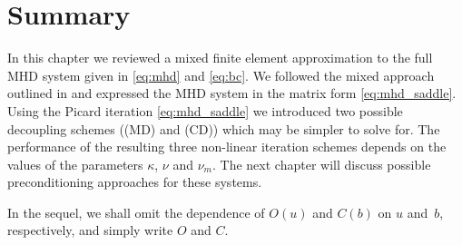 



\section{Summary}

In this chapter we reviewed a mixed finite element approximation to the full MHD system given in \eqref{eq:mhd} and \eqref{eq:bc}. We followed the mixed approach outlined in \cite{schotzau2004mixed} and expressed the MHD system in the matrix form \eqref{eq:mhd_saddle}. Using the Picard iteration  \eqref{eq:mhd_saddle} we introduced two possible decoupling schemes ((MD) and (CD)) which may be simpler to solve for. The performance of the resulting three non-linear iteration schemes depends on the values of the parameters $\kappa$, $\nu$ and $\nu_m$. The next chapter will discuss possible preconditioning approaches for these systems.

In the sequel, we shall omit the dependence of $O(u)$ and $C(b)$ on $u$ and~$b$, respectively, and simply  write $O$ and $C$.









